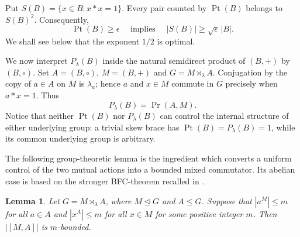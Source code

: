\documentclass[10pt,a4paper]{amsart}
\numberwithin{equation}{section}
\newtheorem{lem}[equation]{Lemma}
\newcommand{\Pt}{\operatorname{Pt} }
\renewcommand{\Pr}{\operatorname{Pr} }
\begin{document}
Put $S(B)=\{x\in B:x*x= 1\}$. Every pair counted by $\Pt(B)$ belongs to
$S(B)^2$. Consequently,
$$
\Pt(B)\geqslant\epsilon
\quad \mbox{ implies }\quad
|S(B)|\geqslant\sqrt{\epsilon}\,|B|.
$$
We shall see below that the exponent $1/2$ is optimal.

We now interpret $P_\lambda(B)$ inside the natural semidirect product of $(B,+)$ by $(B,\circ)$. Set
$A=(B,\circ)$, $M=(B,+)$ and $G=M\rtimes_\lambda A$. Conjugation by the
copy of $a\in A$ on $M$ is $\lambda_a$; hence $a$ and $x\in M$ commute
in $G$ precisely when $a*x=1$. Thus
$$
P_\lambda(B)= \Pr(A,M).
$$
Notice that neither $\Pt(B)$ nor $P_\lambda(B)$ can control the internal
structure of either underlying group: a trivial skew brace has
$\Pt(B)=P_\lambda(B)=1$, while its common underlying group is arbitrary.

The following group-theoretic lemma is the ingredient which converts a
uniform control of the two mutual actions into a bounded mixed
commutator. Its abelian case is based on the stronger BFC-theorem
recalled in \cite[Lemma 2.2, Theorem 2.4]{DS22}.


\begin{lem}\label{lem:mixed-BFC}
Let $G=M \rtimes_\lambda A$, where $M\unlhd G$ and $A\leqslant G$. Suppose that
$|a^M|\leqslant m$ for all $a\in A$ and $|x^A|\leqslant m$ for all $x\in M$ for some positive integer $m$. Then $|[M,A]|$ is $m$-bounded.
\end{lem}
\end{document}
